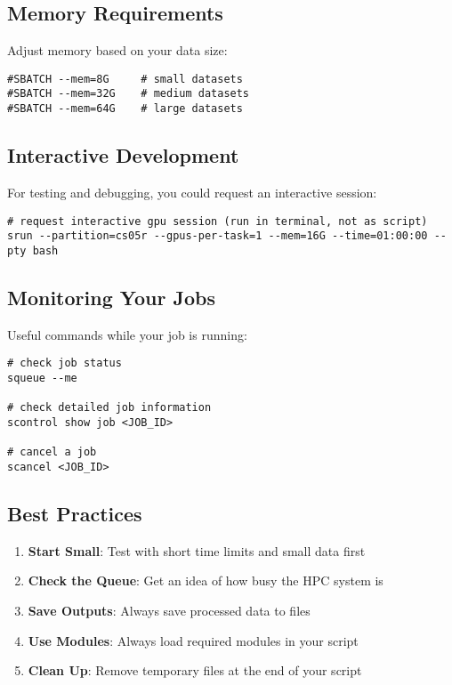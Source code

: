 \documentclass[11pt, a4paper]{article}
\begin{document}
\subsection*{Memory Requirements}

Adjust memory based on your data size:

\begin{lstlisting}
#SBATCH --mem=8G     # small datasets
#SBATCH --mem=32G    # medium datasets
#SBATCH --mem=64G    # large datasets
\end{lstlisting}

\subsection*{Interactive Development}

For testing and debugging, you could request an interactive session:

\begin{lstlisting}
# request interactive gpu session (run in terminal, not as script)
srun --partition=cs05r --gpus-per-task=1 --mem=16G --time=01:00:00 --pty bash
\end{lstlisting}

\subsection*{Monitoring Your Jobs}

Useful commands while your job is running:

\begin{lstlisting}
# check job status
squeue --me

# check detailed job information
scontrol show job <JOB_ID>

# cancel a job
scancel <JOB_ID>
\end{lstlisting}

\subsection*{Best Practices}

\begin{enumerate}
    \item \textbf{Start Small}: Test with short time limits and small data first
    \item \textbf{Check the Queue}: Get an idea of how busy the HPC system is
    \item \textbf{Save Outputs}: Always save processed data to files
    \item \textbf{Use Modules}: Always load required modules in your script
    \item \textbf{Clean Up}: Remove temporary files at the end of your script
\end{enumerate}
\end{document}
